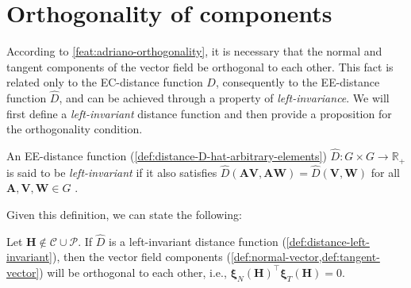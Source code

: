 \section{Orthogonality of components}
According to \cref{feat:adriano-orthogonality}, it is necessary that the normal and tangent components of the vector field be orthogonal to each other. This fact is related only to the EC-distance function $D$, consequently to the EE-distance function $\widehat{D}$, and can be achieved through a property of \emph{left-invariance}. We will first define a \emph{left-invariant} distance function and then provide a proposition for the orthogonality condition.
\begin{definition}\label{def:distance-left-invariant}
    An EE-distance function (\cref{def:distance-D-hat-arbitrary-elements}) $\widehat{D}:G\times G\to\mathbb{R}_+$ is said to be  \emph{left-invariant} if it also satisfies $\widehat{D}(\mathbf{A}\mathbf{V}, \mathbf{A}\mathbf{W}) = \widehat{D}(\mathbf{V}, \mathbf{W})$ for all $\mathbf{A}, \mathbf{V}, \mathbf{W}\in G$ .
\end{definition}
Given this definition, we can state the following:
\begin{proposition}\label{propos:left-invariant-metric-induces-orthogonal}
    Let $\mathbf{H} \not \in \mathcal{C} \cup \mathcal{P}$. If $\widehat{D}$ is a left-invariant distance function (\cref{def:distance-left-invariant}), then the vector field components (\cref{def:normal-vector,def:tangent-vector}) will be orthogonal to each other, i.e., $\boldsymbol{\xi}_N(\mathbf{H})^{\top}\boldsymbol{\xi}_T(\mathbf{H})=0$.
\end{proposition}
